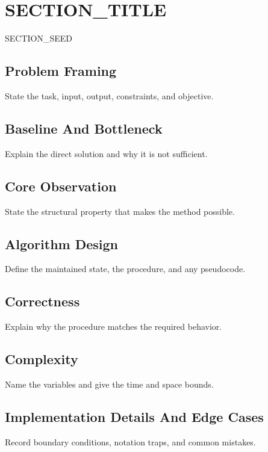 \section{{{SECTION_TITLE}}}

{{SECTION_SEED}}

\subsection{Problem Framing}
State the task, input, output, constraints, and objective.

\subsection{Baseline And Bottleneck}
Explain the direct solution and why it is not sufficient.

\subsection{Core Observation}
State the structural property that makes the method possible.

\subsection{Algorithm Design}
Define the maintained state, the procedure, and any pseudocode.

\subsection{Correctness}
Explain why the procedure matches the required behavior.

\subsection{Complexity}
Name the variables and give the time and space bounds.

\subsection{Implementation Details And Edge Cases}
Record boundary conditions, notation traps, and common mistakes.
